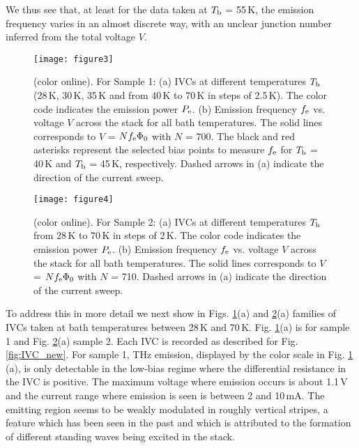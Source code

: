 \documentclass[aps,twocolumn,prb,showpacs,preprintnumbers,superscriptaddress,amsmath,amssymb,longbibliography]{revtex4-1}
\begin{document}
We thus see that, at least for the data taken at $T_{\rm b}$ = 55\,K, the emission frequency varies in an almost discrete way, with an unclear junction number inferred from the total voltage $V$. 
%
\begin{figure}[tb]
\texttt{[image: figure3]}
\caption{(color online). For Sample 1: (a) IVCs at different temperatures $T_{\rm b}$ (28\,K, 30\,K, 35\,K and from 40\,K to 70\,K in steps of 2.5\,K). The color code indicates the emission power $P_{\rm e}$. (b) Emission frequency $f_{\rm e}$ vs. voltage $V$ across the stack for all bath temperatures. The solid lines corresponds to $V$ = $Nf_{\rm e}\Phi_0$ with $N$ = 700. The black and red asterisks represent the selected bias points to measure $f_{\rm e}$ for $T_{\rm b}$  = 40\,K and $T_{\rm b}$  = 45\,K, respectively. Dashed arrows in (a) indicate the direction of the current sweep. 
}
\label{fig:IVE1}
\end{figure}
%
\begin{figure}[tb]
\texttt{[image: figure4]}
\caption{(color online). For Sample 2: (a) IVCs at different temperatures $T_{\rm b}$ from 28\,K to 70\,K in steps of 2\,K. The color code indicates the emission power $P_{\rm e}$. (b) Emission frequency $f_{\rm e}$ vs. voltage $V$ across the stack for all bath temperatures. The solid lines corresponds to $V$ = $Nf_{\rm e}\Phi_0$ with $N$ = 710. Dashed arrows in (a) indicate the direction of the current sweep. 
}
\label{fig:IVE2}
\end{figure}

To address this in more detail we next show in Figs. \ref{fig:IVE1}(a) and \ref{fig:IVE2}(a) families of IVCs taken at bath temperatures between 28\,K and 70\,K.
Fig. \ref{fig:IVE1}(a)  is for sample 1 and Fig. \ref{fig:IVE2}(a) sample 2. 
Each IVC is recorded as described for Fig. \ref{fig:IVC_new}. 
%
For sample 1, THz emission, displayed by the color scale in Fig. \ref{fig:IVE1} (a), is only detectable in the low-bias regime where the differential resistance in the IVC is positive. The maximum voltage where emission occurs is about 1.1\,V and the current range where emission is seen is between 2 and 10\,mA. The emitting region seems to be weakly modulated in roughly vertical stripes, a feature which has been seen in the past \cite{Kitamura14,Rudau15,Tsujimoto16} and which is attributed to the formation of different standing waves being excited in the stack. 
\end{document}
